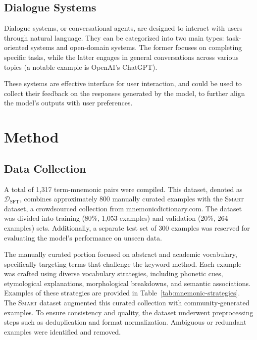\documentclass[11pt, onecolumn]{article}
\newcounter{para}
\begin{document}
\subsection{Dialogue Systems} \label{sec:dialogue}

Dialogue systems, or conversational agents, are designed to interact with users through natural language. They can be categorized into two main types: task-oriented systems and open-domain systems. The former focuses on completing specific tasks, while the latter engages in general conversations across various topics (a notable example is OpenAI's ChatGPT).

These systems are effective interface for user interaction, and could be used to collect their feedback on the responses generated by the model, to further align the model's outputs with user preferences.

\section{Method} \label{sec:method}

\subsection{Data Collection} \label{sec:met-data}

A total of 1,317 term-mnemonic pairs were compiled. This dataset, denoted as \( \mathcal{D}_{\text{SFT}} \), combines approximately 800 manually curated examples with the \textsc{Smart} dataset, a crowdsourced collection from mnemonicdictionary.com. The dataset was divided into training (80\%, 1,053 examples) and validation (20\%, 264 examples) sets. Additionally, a separate test set of 300 examples was reserved for evaluating the model's performance on unseen data.

The manually curated portion focused on abstract and academic vocabulary, specifically targeting terms that challenge the keyword method. Each example was crafted using diverse vocabulary strategies, including phonetic cues, etymological explanations, morphological breakdowns, and semantic associations. Examples of these strategies are provided in Table~\ref{tab:mnemonic-strategies}. The \textsc{Smart} dataset augmented this curated collection with community-generated examples. To ensure consistency and quality, the dataset underwent preprocessing steps such as deduplication and format normalization. Ambiguous or redundant examples were identified and removed.
\end{document}
